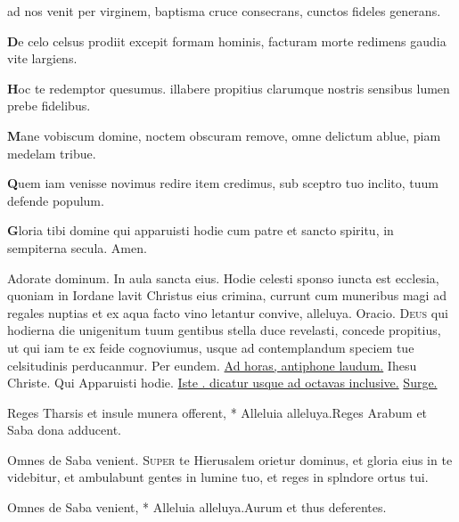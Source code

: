 \begin{multicols*}{2}
{ad nos venit per virginem,
baptisma cruce consecrans,
cunctos fideles generans.
\par {\bfseries \color{Red} D}e celo celsus prodiit
excepit formam hominis,
facturam morte redimens
gaudia vite largiens.
\par {\bfseries \color{Blue} H}oc te redemptor quesumus.
illabere propitius
clarumque nostris sensibus
lumen prebe fidelibus.
\par {\bfseries \color{Red} M}ane vobiscum domine,
noctem obscuram remove,
omne delictum ablue,
piam medelam tribue.
\par {\bfseries \color{Blue} Q}uem iam venisse novimus
redire item credimus,
sub sceptro tuo inclito,
tuum defende populum.
\par {\bfseries \color{Red} G}loria tibi domine
qui apparuisti hodie
cum patre et sancto spiritu,
in sempiterna secula. Amen.
}
\newline \V Adorate dominum. \R In aula sancta eius.
 Hodie celesti sponso iuncta est ecclesia, quoniam in Iordane lavit Christus eius crimina, currunt cum muneribus magi ad regales nuptias et ex aqua facto vino letantur convive, alleluya. {\color{Red} Oracio.}
\lettrine[lines=2]{\zallmancaps \color{Blue} D}{eus} \hypertarget{deus-qui-hodierna-epiphanie}{qui} hodierna die unigenitum tuum gentibus stella duce revelasti, concede propitius, ut qui iam te ex feide cognoviumus, usque ad contemplandum speciem tue celsitudinis perducanmur. Per eundem. \ul{Ad horas, antiphone laudum.}
 \R Ihesu Christe. \V Qui Apparuisti hodie. \ul{Iste \Vbar . dicatur usque ad octavas inclusive.}
 \hyperlink{surge-capitulum}{Surge.}
\begin{responsory-breve}
{Reges Tharsis et insule munera offerent, * Alleluia alleluya.}{Reges Arabum et Saba dona adducent.}
\end{responsory-breve}
\V Omnes de Saba venient.
\lettrine[lines=2]{\zallmancaps \color{Red} S}{uper} te Hierusalem orietur dominus, et gloria eius in te videbitur, et ambulabunt gentes in lumine tuo, et reges in splndore ortus tui.
\begin{responsory-breve}
{Omnes de Saba venient, * Alleluia alleluya.}{Aurum et thus deferentes.}
\end{responsory-breve}

\end{multicols*}
